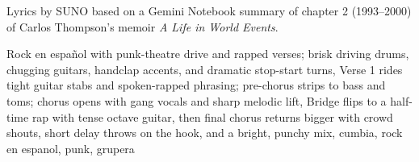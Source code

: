 
\begin{notes}
Lyrics by SUNO based on a Gemini Notebook summary of chapter 2 (1993--2000) of Carlos Thompson's memoir \emph{A Life in World Events}.
\end{notes}
\begin{style}
Rock en español with punk-theatre drive and rapped verses; brisk driving drums, chugging guitars, handclap accents, and dramatic stop-start turns, Verse 1 rides tight guitar stabs and spoken-rapped phrasing; pre-chorus strips to bass and toms; chorus opens with gang vocals and sharp melodic lift, Bridge flips to a half-time rap with tense octave guitar, then final chorus returns bigger with crowd shouts, short delay throws on the hook, and a bright, punchy mix, cumbia, rock en espanol, punk, grupera
\end{style}
